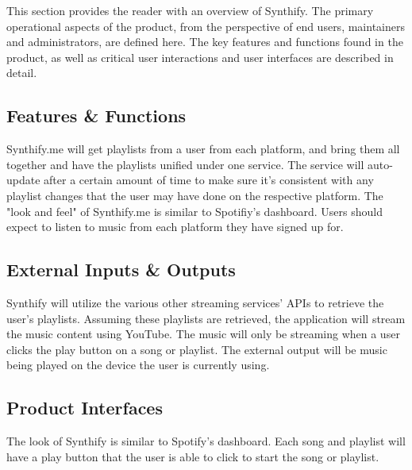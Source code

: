 This section provides the reader with an overview of Synthify. The primary operational aspects of the product, from the perspective of end users, maintainers and administrators, are defined here. The key features and functions found in the product, as well as critical user interactions and user interfaces are described in detail.

\subsection{Features \& Functions}
Synthify.me will get playlists from a user from each platform, and bring them all together and have the playlists unified under one service. The service will auto-update after a certain amount of time to make sure it's consistent with any playlist changes that the user may have done on the respective platform. The "look and feel" of Synthify.me is similar to Spotifiy's dashboard. Users should expect to listen to music from each platform they have signed up for.

\subsection{External Inputs \& Outputs}
Synthify will utilize the various other streaming services' APIs to retrieve the user's playlists. Assuming these playlists are retrieved, the application will stream the music content using YouTube. The music will only be streaming when a user clicks the play button on a song or playlist. The external output will be music being played on the device the user is currently using.

\subsection{Product Interfaces}
The look of Synthify is similar to Spotify's dashboard. Each song and playlist will have a play button that the user is able to click to start the song or playlist. 

